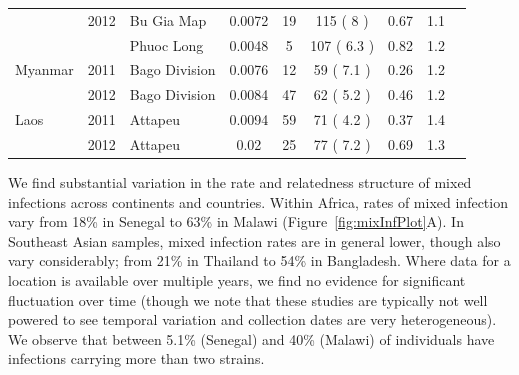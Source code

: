 \documentclass[9pt,lineno]{elife}
\begin{document}
\begin{table}[btp]
{\begin{tabular}{p{1.3cm} c p{1.8cm} c | c c c c p{2.7cm}}
         & 2012 & Bu Gia Map & 0.0072 & 19 & 115 ( 8 )& 0.67 & 1.1&\\
         &      & Phuoc Long & 0.0048 & 5 & 107 ( 6.3 )& 0.82 & 1.2&\\
\cline{1-8}
Myanmar & 2011 & Bago Division & 0.0076 & 12 & 59 ( 7.1 )& 0.26 & 1.2 &\\
        & 2012 & Bago Division & 0.0084 & 47 & 62 ( 5.2 )& 0.46 & 1.2 &\\
\cline{1-8}
Laos & 2011 & Attapeu & 0.0094 & 59 & 71 ( 4.2 )& 0.37 & 1.4 &\\
     & 2012 & Attapeu & 0.02 & 25 & 77 ( 7.2 )& 0.69 & 1.3 &\\
\hline
\hline
\end{tabular}
}

\end{table}



We find substantial variation in the rate and relatedness structure of mixed infections across continents and countries.  Within Africa, rates of mixed infection vary from 18\% in Senegal to 63\% in Malawi (Figure~\ref{fig:mixInfPlot}A). In Southeast Asian samples, mixed infection rates are in general lower, though also vary considerably; from 21\% in Thailand to 54\% in Bangladesh.  Where data for a location is available over multiple years, we find no evidence for significant fluctuation over time (though we note that these studies are typically not well powered to see temporal variation and collection dates are very heterogeneous). We observe that between 5.1\% (Senegal) and 40\% (Malawi) of individuals have infections carrying more than two strains.
\end{document}
